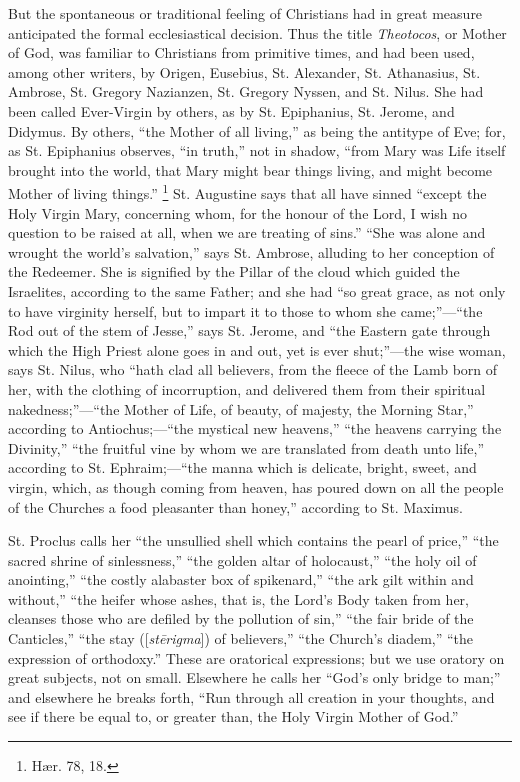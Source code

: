 But the spontaneous or traditional feeling of
Christians had in great measure anticipated the formal
ecclesiastical decision. Thus the title \emph{Theotocos},
or Mother of God, was familiar to Christians from
primitive times, and had been used, among other writers,
by Origen, Eusebius, St. Alexander, St. Athanasius, St.
Ambrose, St. Gregory Nazianzen, St. Gregory Nyssen, and
St. Nilus. She had been called Ever-Virgin by others, as
by St. Epiphanius, St. Jerome, and Didymus. By others,
``the Mother of all living,'' as being the
antitype of Eve; for, as St. Epiphanius observes,
``in truth,'' not in shadow, ``from Mary was
Life itself brought into the world, that Mary might bear
things living, and might become Mother of living
things.'' \footnote{Hær. 78, 18.} St. Augustine says that all have sinned
``except the Holy Virgin Mary, concerning whom, for
the honour of the Lord, I wish no question to be raised
at all, when we are treating of sins.'' ``She was
alone and wrought the world's salvation,'' says St.
Ambrose, alluding to her conception of the Redeemer. She
is signified by the Pillar of the cloud which guided the
Israelites, according to the same Father; and she had
``so great grace, as not only to have virginity
herself, but to impart it to those to whom she
came;''—``the Rod out of the stem of
Jesse,'' says St. Jerome, and ``the Eastern gate
through which the High Priest alone goes in and out, yet
is ever shut;''—the wise woman, says St. Nilus,
who ``hath clad all believers, from the fleece of the
Lamb born of her, with the clothing of incorruption, and
delivered them from their spiritual
nakedness;''—``the Mother of Life, of
beauty, of majesty, the Morning Star,'' according to
Antiochus;—``the mystical new heavens,''
``the heavens carrying the Divinity,'' ``the
fruitful vine by whom we are translated from death unto
life,'' according to St. Ephraim;—``the manna
which is delicate, bright, sweet, and virgin, which, as
though coming from heaven, has poured down on all the
people of the Churches a food pleasanter than
honey,'' according to St. Maximus.

St. Proclus calls her ``the unsullied shell which
contains the pearl of price,'' ``the sacred
shrine of sinlessness,'' ``the golden altar of
holocaust,'' ``the holy oil of anointing,''
``the costly alabaster box of spikenard,''
``the ark gilt within and without,'' ``the
heifer whose ashes, that is, the Lord's Body taken from
her, cleanses those who are defiled by the pollution of
sin,'' ``the fair bride of the Canticles,''
``the stay ([\emph{st\={e}rigma}]) of believers,'' ``the
Church's diadem,'' ``the expression of
orthodoxy.'' These are oratorical expressions; but we
use oratory on great subjects, not on small. Elsewhere he
calls her ``God's only bridge to man;'' and
elsewhere he breaks forth, ``Run through all creation
in your thoughts, and see if there be equal to, or
greater than, the Holy Virgin Mother of God.''

